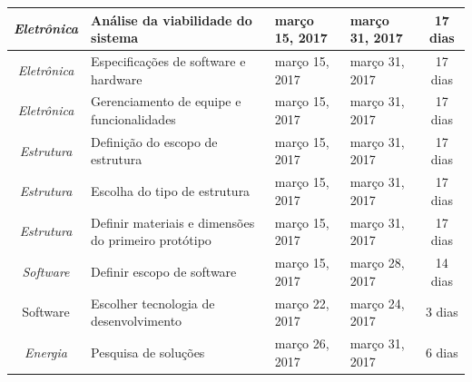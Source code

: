 \begin{longtable}{|c|m{6.5cm}|m{3.2cm}|m{3.2cm}|c|}
\textit{Eletrônica}                                                       & Análise da viabilidade do sistema                    & março 15, 2017                       & março 31, 2017                    & 17 dias                               \\ \hline
\textit{Eletrônica}                                                       & Especificações de software e hardware                & março 15, 2017                       & março 31, 2017                    & 17 dias                               \\ \hline
\textit{Eletrônica}                                                       & Gerenciamento de equipe e funcionalidades            & março 15, 2017                       & março 31, 2017                    & 17 dias                               \\ \hline
\textit{Estrutura}                                                        & Definição do escopo de estrutura                     & março 15, 2017                       & março 31, 2017                    & 17 dias                               \\ \hline
\textit{Estrutura}                                                        & Escolha do tipo de estrutura                         & março 15, 2017                       & março 31, 2017                    & 17 dias                               \\ \hline
\textit{Estrutura}                                                        & Definir materiais e dimensões do primeiro protótipo  & março 15, 2017                       & março 31, 2017                    & 17 dias                               \\ \hline
\textit{Software}                                                         & Definir escopo de software                           & março 15, 2017                       & março 28, 2017                    & 14 dias                               \\ \hline
Software                                                                  & Escolher tecnologia de desenvolvimento               & março 22, 2017                       & março 24, 2017                    & 3 dias                                \\ \hline
\textit{Energia}                                                          & Pesquisa de soluções                                 & março 26, 2017                       & março 31, 2017                    & 6 dias                                \\ \hline

\end{longtable}
